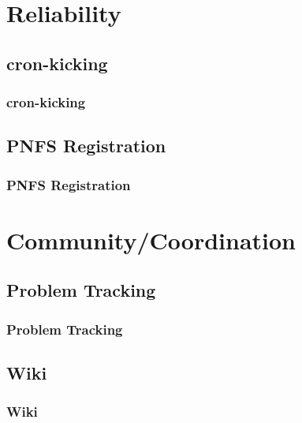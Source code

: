 \documentclass{beamer}
\begin{document}
\section{Reliability}
\subsection{cron-kicking}
\begin{frame}
\frametitle{cron-kicking}
\end{frame}

\subsection{PNFS Registration}
\begin{frame}
\frametitle{PNFS Registration}
\end{frame}

\section{Community/Coordination}
\subsection{Problem Tracking}
\begin{frame}
\frametitle{Problem Tracking}
\end{frame}

\subsection{Wiki}
\begin{frame}
\frametitle{Wiki}
\end{frame}
\end{document}
